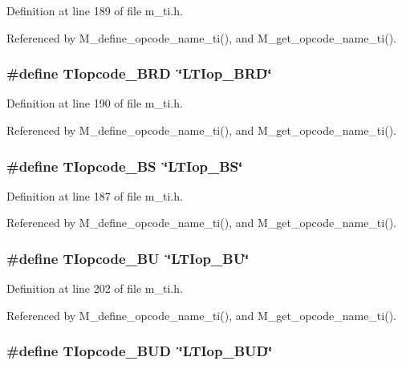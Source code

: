 Definition at line 189 of file m\_\-ti.h.

Referenced by M\_\-define\_\-opcode\_\-name\_\-ti(), and M\_\-get\_\-opcode\_\-name\_\-ti().
\subsubsection{\setlength{\rightskip}{0pt plus 5cm}\#define TIopcode\_\-BRD~\char`\"{}LTIop\_\-BRD\char`\"{}}\label{m__ti_8h_b52c45be1280d59f65710b0f0f54b24d}




Definition at line 190 of file m\_\-ti.h.

Referenced by M\_\-define\_\-opcode\_\-name\_\-ti(), and M\_\-get\_\-opcode\_\-name\_\-ti().
\subsubsection{\setlength{\rightskip}{0pt plus 5cm}\#define TIopcode\_\-BS~\char`\"{}LTIop\_\-BS\char`\"{}}\label{m__ti_8h_0b135b0bd5d8c301ef1dfbc263893e07}




Definition at line 187 of file m\_\-ti.h.

Referenced by M\_\-define\_\-opcode\_\-name\_\-ti(), and M\_\-get\_\-opcode\_\-name\_\-ti().
\subsubsection{\setlength{\rightskip}{0pt plus 5cm}\#define TIopcode\_\-BU~\char`\"{}LTIop\_\-BU\char`\"{}}\label{m__ti_8h_accf73734aeaa19a3c6dd5111a631016}




Definition at line 202 of file m\_\-ti.h.

Referenced by M\_\-define\_\-opcode\_\-name\_\-ti(), and M\_\-get\_\-opcode\_\-name\_\-ti().
\subsubsection{\setlength{\rightskip}{0pt plus 5cm}\#define TIopcode\_\-BUD~\char`\"{}LTIop\_\-BUD\char`\"{}}\label{m__ti_8h_0a6552a73d39dbf757d742dbc9f11e71}




